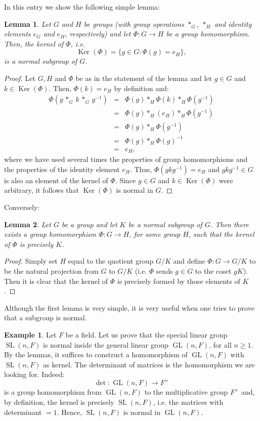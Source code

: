 \documentclass[12pt]{article}
\newtheorem{lemma}{Lemma}
\theoremstyle{definition}
\newtheorem*{exa}{Example}
\newcommand{\SL}{\operatorname{SL}}
\newcommand{\GL}{\operatorname{GL}}
\newcommand{\Ker}{\operatorname{Ker}}
\begin{document}
 In this entry we show the following simple lemma:

\begin{lemma}
Let $G$ and $H$ be groups (with group operations $\ast_G$, $\ast_H$ and identity elements $e_G$ and $e_H$, respectively) and let $\Phi:G\to H$ be a group homomorphism. Then, the kernel of $\Phi$, i.e.
$$\Ker(\Phi)=\{ g\in G : \Phi(g)=e_H\},$$
is a normal subgroup of $G$.
\end{lemma}
\begin{proof}
Let $G,H$ and $\Phi$ be as in the statement of the lemma and let $g\in G$ and $k\in \Ker(\Phi)$. Then, $\Phi(k)=e_H$ by definition and:
\begin{eqnarray*}
\Phi(g \, \ast_G \, k \, \ast_G \, g^{-1}) &=& \Phi(g)\ast_H \Phi(k) \ast_H \Phi(g^{-1})\\
& = & \Phi(g)\ast_H ( e_H ) \ast_H \Phi(g^{-1})\\
& = & \Phi(g) \ast_H \Phi(g^{-1}) \\
& = & \Phi(g) \ast_H \Phi(g)^{-1}\\
& = & e_H,
\end{eqnarray*}
where we have used several times the properties of group homomorphisms and the properties of the identity element $e_H$. Thus, $\Phi(gkg^{-1})=e_H$ and $gkg^{-1}\in G$ is also an element of the kernel of $\Phi$. Since $g\in G$ and $k\in \Ker(\Phi)$ were arbitrary, it follows that $\Ker(\Phi)$ is normal in $G$.
\end{proof}

Conversely:

\begin{lemma}
Let $G$ be a group and let $K$ be a normal subgroup of $G$. Then there exists a group homomorphism $\Phi:G\to H$, for some group $H$, such that the kernel of $\Phi$ is precisely $K$.
\end{lemma}
\begin{proof}
Simply set $H$ equal to the quotient group $G/K$ and define $\Phi:G \to G/K$ to be the natural projection from $G$ to $G/K$ (i.e. $\Phi$ sends $g\in G$ to the coset $gK$). Then it is clear that the kernel of $\Phi$ is precisely formed by those elements of $K$.
\end{proof}

Although the first lemma is very simple, it is very useful when one tries to prove that a subgroup is normal.

\begin{exa}
Let $F$ be a field. Let us prove that the special linear group $\SL(n,F)$ is normal inside the general linear group $\GL(n,F)$, for all $n\geq 1$. By the lemmas, it suffices to construct a homomorphism of $\GL(n,F)$ with $\SL(n,F)$ as kernel. The determinant of matrices is the homomorphism we are looking for. Indeed:
$$\det : \GL(n,F) \to F^\times$$
is a group homomorphism from $\GL(n,F)$ to the multiplicative group $F^\times$ and, by definition, the kernel is precisely $\SL(n,F)$, i.e. the matrices with determinant $=1$. Hence, $\SL(n,F)$ is normal in $\GL(n,F)$.
\end{exa}
\end{document}
